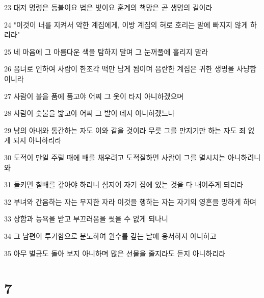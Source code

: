 \par 23 대저 명령은 등불이요 법은 빛이요 훈계의 책망은 곧 생명의 길이라
\par 24 "이것이 너를 지켜서 악한 계집에게, 이방 계집의 혀로 호리는 말에 빠지지 않게 하리라"
\par 25 네 마음에 그 아름다운 색을 탐하지 말며 그 눈꺼풀에 홀리지 말라
\par 26 음녀로 인하여 사람이 한조각 떡만 남게 됨이며 음란한 계집은 귀한 생명을 사냥함이니라
\par 27 사람이 불을 품에 품고야 어찌 그 옷이 타지 아니하겠으며
\par 28 사람이 숯불을 밟고야 어찌 그 발이 데지 아니하겠느나
\par 29 남의 아내와 통간하는 자도 이와 같을 것이라 무릇 그를 만지기만 하는 자도 죄 없게 되지 아니하리라
\par 30 도적이 만일 주릴 때에 배를 채우려고 도적질하면 사람이 그를 멸시치는 아니하려니와
\par 31 들키면 칠배를 갚아야 하리니 심지어 자기 집에 있는 것을 다 내어주게 되리라
\par 32 부녀와 간음하는 자는 무지한 자라 이것을 행하는 자는 자기의 영혼을 망하게 하며
\par 33 상함과 능욕을 받고 부끄러움을 씻을 수 없게 되나니
\par 34 그 남편이 투기함으로 분노하여 원수를 갚는 날에 용서하지 아니하고
\par 35 아무 벌금도 돌아 보지 아니하며 많은 선물을 줄지라도 듣지 아니하리라

\chapter{7}

